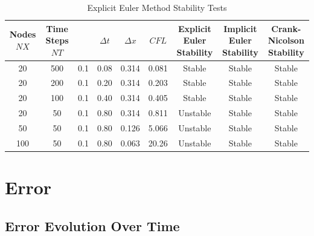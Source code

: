 \documentclass[10pt, letter, showtrims]{extarticle}
\begin{document}
		\FloatBarrier
		\begin{table}[h]
			\caption{Explicit Euler Method Stability Tests}
			\centering
			\begin{tabular}{|c|c|c|c|c|c|c|c|c|}
				\hline
				\makecell{Nodes \\ $NX$} & \makecell{Time Steps \\ $NT$} & \makecell{$K$} & $\Delta t$ & $\Delta x$ & $CFL$ & \makecell{Explicit Euler \\ Stability} & \makecell{Implicit Euler \\ Stability} & \makecell{Crank-Nicolson \\ Stability} \\
				\hline \rowcolor{Gray} 
				20  & 500 & 0.1 & 0.08 & 0.314 & 0.081 & Stable & Stable & Stable  \\
				\hline
				20  & 200 & 0.1 & 0.20 & 0.314 & 0.203 & Stable & Stable & Stable  \\
				\hline \rowcolor{Gray} 
				20  & 100 & 0.1 & 0.40 & 0.314 & 0.405 & Stable & Stable & Stable  \\
				\hline
				20  & 50  & 0.1 & 0.80 & 0.314 & 0.811 & Unstable & Stable & Stable \\
				\hline \rowcolor{Gray}
				50  & 50  & 0.1 & 0.80 & 0.126 & 5.066 & Unstable & Stable & Stable \\
				\hline
				100 & 50  & 0.1 & 0.80 & 0.063 & 20.26 & Unstable & Stable & Stable \\
				\hline
			\end{tabular}
		\end{table}
		\FloatBarrier
		
		\pagebreak
		
		\section{Error}
		
		\subsection{Error Evolution Over Time}
\end{document}
